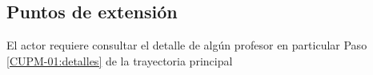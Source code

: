 	
	
	
	\subsection{Puntos de extensión}
	
	\UCExtensionPoint
	{El actor requiere consultar el detalle de algún profesor en particular}
	{ Paso \ref{CUPM-01:detalles} de la trayectoria principal}
	{}
